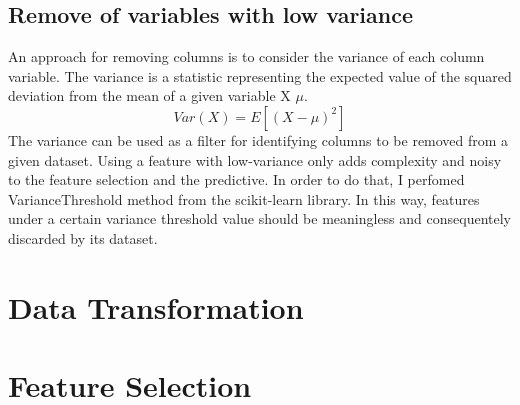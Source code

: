 \subsection{Remove of variables with low variance}
An approach for removing columns is to consider the variance of each column variable. The variance is a statistic representing the expected value of the squared deviation from the mean of a given variable X $\mu$. 
\begin{equation}
  Var(X) = E[(X-\mu)^2]
\end{equation}
The variance can be used as a filter for identifying columns to be removed from a given dataset. 
Using a feature with low-variance only adds complexity and noisy to the feature selection and the predictive.
In order to do that, I perfomed VarianceThreshold method from the scikit-learn library. In this way, features under a certain variance threshold value should be meaningless and consequentely discarded by its dataset. 
\section{Data Transformation}

\section{Feature Selection}




